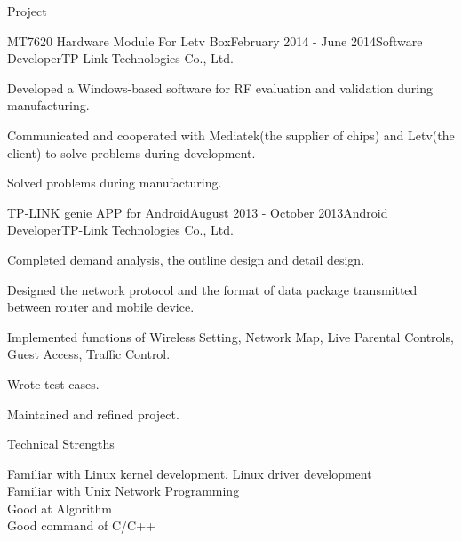 \documentclass{resume} %
\begin{document}
\begin{rSection}{Project}

\begin{rSubsection}{MT7620 Hardware Module For Letv Box}{February 2014 - June 2014}{Software Developer}{TP-Link Technologies Co., Ltd.}
	\item Developed a Windows-based software for RF evaluation and validation during manufacturing.
	\item Communicated and cooperated with Mediatek(the supplier of chips) and Letv(the client) to solve problems during development.
	\item Solved problems during manufacturing.
\end{rSubsection}


\begin{rSubsection}{TP-LINK genie APP for Android}{August 2013 - October 2013}{Android Developer}{TP-Link Technologies Co., Ltd.}
\item Completed demand analysis, the outline design and detail design.
\item Designed the network protocol and the format of data package transmitted between router and mobile device.
\item Implemented functions of Wireless Setting, Network Map, Live Parental Controls, Guest Access, Traffic Control.
\item Wrote test cases.
\item Maintained and refined project.
\end{rSubsection}

\end{rSection}


\begin{rSection}{Technical Strengths}

Familiar with Linux kernel development, Linux driver development\\
Familiar with Unix Network Programming\\
Good at Algorithm \\
Good command of C/C++ 

\end{rSection}
\end{document}
